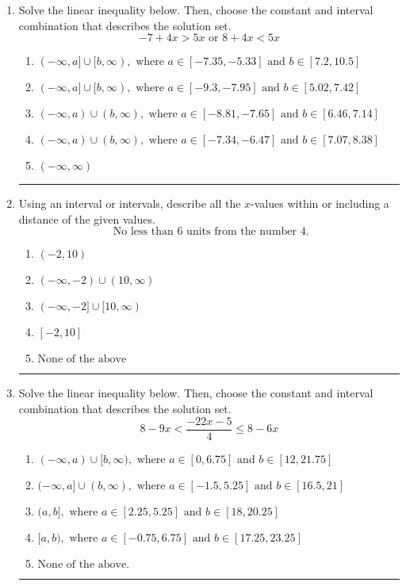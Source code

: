 \documentclass[14pt]{extbook}
\newcommand{\litem}[1]{\item#1\hspace*{-1cm}\rule{\textwidth}{0.4pt}}
\begin{document}
\begin{enumerate}
{\begin{enumerate}[label=\Alph*.]
\end{enumerate} }
\litem{
Solve the linear inequality below. Then, choose the constant and interval combination that describes the solution set.\[ -7 + 4 x > 5 x \text{ or } 8 + 4 x < 5 x \]\begin{enumerate}[label=\Alph*.]
\item \( (-\infty, a] \cup [b, \infty), \text{ where } a \in [-7.35, -5.33] \text{ and } b \in [7.2, 10.5] \)
\item \( (-\infty, a] \cup [b, \infty), \text{ where } a \in [-9.3, -7.95] \text{ and } b \in [5.02, 7.42] \)
\item \( (-\infty, a) \cup (b, \infty), \text{ where } a \in [-8.81, -7.65] \text{ and } b \in [6.46, 7.14] \)
\item \( (-\infty, a) \cup (b, \infty), \text{ where } a \in [-7.34, -6.47] \text{ and } b \in [7.07, 8.38] \)
\item \( (-\infty, \infty) \)

\end{enumerate} }
\litem{
Using an interval or intervals, describe all the $x$-values within or including a distance of the given values.\[ \text{ No less than } 6 \text{ units from the number } 4. \]\begin{enumerate}[label=\Alph*.]
\item \( (-2, 10) \)
\item \( (-\infty, -2) \cup (10, \infty) \)
\item \( (-\infty, -2] \cup [10, \infty) \)
\item \( [-2, 10] \)
\item \( \text{None of the above} \)

\end{enumerate} }
\litem{
Solve the linear inequality below. Then, choose the constant and interval combination that describes the solution set.\[ 8 - 9 x < \frac{-22 x - 5}{4} \leq 8 - 6 x \]\begin{enumerate}[label=\Alph*.]
\item \( (-\infty, a) \cup [b, \infty), \text{ where } a \in [0, 6.75] \text{ and } b \in [12, 21.75] \)
\item \( (-\infty, a] \cup (b, \infty), \text{ where } a \in [-1.5, 5.25] \text{ and } b \in [16.5, 21] \)
\item \( (a, b], \text{ where } a \in [2.25, 5.25] \text{ and } b \in [18, 20.25] \)
\item \( [a, b), \text{ where } a \in [-0.75, 6.75] \text{ and } b \in [17.25, 23.25] \)
\item \( \text{None of the above.} \)


\end{enumerate}}
\end{enumerate}
\end{document}
